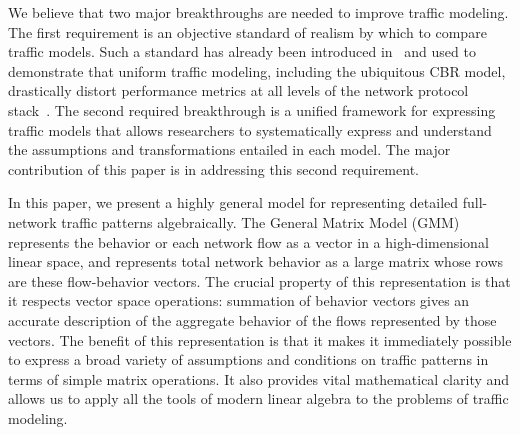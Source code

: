 \documentclass[conference]{IEEEtran}
\newcommand{\caps}[1]{{\small{#1}}}
\begin{document}
We believe that two major breakthroughs are needed to improve traffic modeling. The first requirement is an objective standard of realism by which to compare traffic models. Such a standard has already been introduced in~\cite{Karpinski07:realism} and used to demonstrate that uniform traffic modeling, including the ubiquitous \caps{CBR} model, drastically distort performance metrics at all levels of the network protocol stack~\cite{Karpinski07:cbr-failure}. The second required breakthrough is a unified framework for expressing traffic models that allows researchers to systematically express and understand the assumptions and transformations entailed in each model. The major contribution of this paper is in addressing this second requirement.


In this paper, we present a highly general model for representing detailed full-network traffic patterns algebraically. The General Matrix Model (\caps{GMM}) represents the behavior or each network flow as a vector in a high-dimensional linear space, and represents total network behavior as a large matrix whose rows are these flow-behavior vectors. The crucial property of this representation is that it respects vector space operations: summation of behavior vectors gives an accurate description of the aggregate behavior of the flows represented by those vectors. The benefit of this representation is that it makes it immediately possible to express a broad variety of assumptions and conditions on traffic patterns in terms of simple matrix operations. It also provides vital mathematical clarity and allows us to apply all the tools of modern linear algebra to the problems of traffic modeling.

\end{document}
